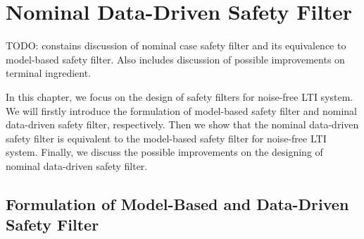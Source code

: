 \chapter{Nominal Data-Driven Safety Filter}\label{chap:nominal-ddsf}
TODO: constains discussion of nominal case safety filter and its equivalence to model-based safety filter. Also includes discussion of possible improvements on terminal ingredient.

In this chapter, we focus on the design of safety filters for noise-free LTI system.
We will firstly introduce the formulation of model-based safety filter and nominal data-driven safety filter, respectively.
Then we show that the nominal data-driven safety filter is equivalent to the model-based safety filter for noise-free LTI system.
Finally, we discuss the possible improvements on the designing of nominal data-driven safety filter.

\section{Formulation of Model-Based and Data-Driven Safety Filter}

